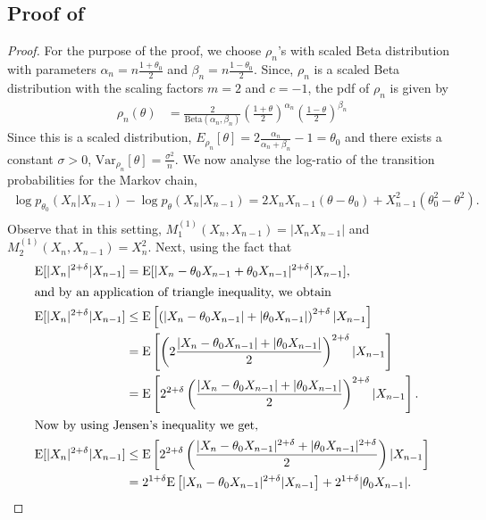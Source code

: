 \documentclass[11pt]{amsart}
\newcommand{\E}{\mathrm{E}}
\newcommand{\Var}{\mathrm{Var}}
\begin{document}
\subsection{Proof of }
%
\begin{proof}
For the purpose of the proof, we choose $\rho_n$'s with scaled Beta distribution with parameters $\alpha_n=n\frac{1+\theta_0}{2}$ and $\beta_n=n\frac{1-\theta_0}{2}$. Since, $\rho_n$ is a scaled Beta distribution with the scaling factors $m=2$ and $c=-1$, the pdf of $\rho_n$ is given by
\begin{align*}
    \rho_n(\theta) & = \frac{2}{\text{Beta}(\alpha_n,\beta_n)}\left(\frac{1+\theta}{2}\right)^{\alpha_n}\left(\frac{1-\theta}{2}\right)^{\beta_n}
\end{align*} 
Since this is a scaled distribution, $E_{\rho_n}[\theta]=2\frac{\alpha_n}{\alpha_n+\beta_n}-1=\theta_0$ and there exists a constant $\sigma>0$, $\Var_{\rho_n}[\theta]=\frac{\sigma^2}{n}$.
We now analyse the log-ratio of the transition probabilities for the Markov chain,
%
\begin{align*}
 \log p_{\theta_0}(X_n|X_{n-1})-\log p_{\theta}(X_n|X_{n-1})  = 2X_nX_{n-1}(\theta-\theta_0)+X_{n-1}^2(\theta_0^2-\theta^2).\\
\end{align*}
%
Observe that in this setting, $M^{(1)}_1(X_n,X_{n-1})=|X_nX_{n-1}|$ and $M^{(1)}_2(X_n,X_{n-1})=X_n^2$. 
%
Next, using the fact that
%
\begin{align*}
\E[|X_n|^{2+\delta}|X_{n-1}] & = \E[|X_n-\theta_0X_{n-1}+\theta_0X_{n-1}|^{2+\delta}|X_{n-1}], \\
\intertext{and by an application of triangle inequality, we obtain}
    \E[|X_n|^{2+\delta}|X_{n-1}] & \leq \E \left[\left(|X_n-\theta_0X_{n-1}|+|\theta_0X_{n-1}|\right)^{2+\delta}|X_{n-1}\right]\\
    & = \E \left[\left(2 \frac{|X_n-\theta_0X_{n-1}|+|\theta_0X_{n-1}|}{2}\right)^{2+\delta}|X_{n-1}\right]\\
    & = \E \left[2^{2+\delta}\left( \frac{|X_n-\theta_0X_{n-1}|+|\theta_0X_{n-1}|}{2}\right)^{2+\delta}|X_{n-1}\right].\\
\intertext{Now by using Jensen's inequality we get,}
     \E[|X_n|^{2+\delta}|X_{n-1}] & \leq \E \left[2^{2+\delta}\left( \frac{|X_n-\theta_0X_{n-1}|^{2+\delta}+|\theta_0X_{n-1}|^{2+\delta}}{2}\right)|X_{n-1}\right]\\
    & = 2^{1+\delta}\E\left[|X_n-\theta_0X_{n-1}|^{2+\delta}|X_{n-1}\right]+2^{1+\delta}|\theta_0X_{n-1}|.\\

\end{align*}
\end{proof}
\end{document}
